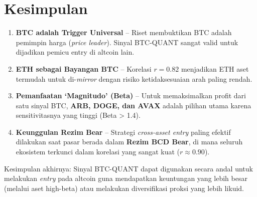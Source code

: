 \documentclass[
  11pt,
  a4paper,
]{article}
\providecommand{\tightlist}{%
  \setlength{\itemsep}{0pt}\setlength{\parskip}{0pt}}
\begin{document}
\section{Kesimpulan}\label{kesimpulan}

\begin{enumerate}
\def\labelenumi{\arabic{enumi}.}
\tightlist
\item
  \textbf{BTC adalah Trigger Universal} -- Riset membuktikan BTC adalah
  pemimpin harga (\emph{price leader}). Sinyal BTC-QUANT sangat valid
  untuk dijadikan pemicu entry di altcoin lain.
\item
  \textbf{ETH sebagai Bayangan BTC} -- Korelasi \(r=0.82\) menjadikan
  ETH aset termudah untuk di-\emph{mirror} dengan risiko ketidaksesuaian
  arah paling rendah.
\item
  \textbf{Pemanfaatan `Magnitudo' (Beta)} -- Untuk memaksimalkan profit
  dari satu sinyal BTC, \textbf{ARB, DOGE, dan AVAX} adalah pilihan
  utama karena sensitivitasnya yang tinggi (Beta \textgreater{} 1.4).
\item
  \textbf{Keunggulan Rezim Bear} -- Strategi \emph{cross-asset entry}
  paling efektif dilakukan saat pasar berada dalam \textbf{Rezim BCD
  Bear}, di mana seluruh ekosistem terkunci dalam korelasi yang sangat
  kuat (\(r \approx 0.90\)).
\end{enumerate}

Kesimpulan akhirnya: Sinyal BTC-QUANT dapat digunakan secara andal untuk
melakukan \emph{entry} pada altcoin guna mendapatkan keuntungan yang
lebih besar (melalui aset high-beta) atau melakukan diversifikasi proksi
yang lebih likuid.
\end{document}
